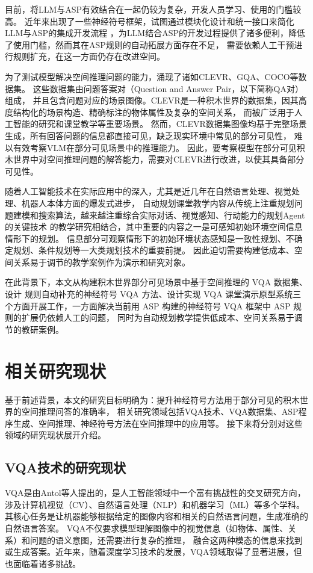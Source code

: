 目前，将LLM与ASP有效结合在一起仍较为复杂，开发人员学习、使用的门槛较高。
近年来出现了一些神经符号框架，试图通过模块化设计和统一接口来简化LLM与ASP的集成开发流程\cite{wang2024dspy}
，为LLM结合ASP的开发过程提供了诸多便利，降低了使用门槛，然而其在ASP规则的自动拓展方面存在不足，
需要依赖人工干预进行规则扩充，在这一方面仍存在改进空间。

为了测试模型解决空间推理问题的能力，涌现了诸如CLEVR、GQA、COCO等数据集。
这些数据集由问题答案对（Question and Answer Pair，以下简称QA对）组成，
并且包含问题对应的场景图像。CLEVR是一种积木世界的数据集，因其高度结构化的场景构造、精确标注的物体属性及复杂的空间关系，
而被广泛用于人工智能的研究和课堂教学等重要场景。
然而，CLEVR数据集图像均基于完整场景生成，所有回答问题的信息都直接可见，缺乏现实环境中常见的部分可见性，
难以有效考察VLM在部分可见场景中的推理能力\cite{sam-abraham-etal-2024-clevr}。
因此，要考察模型在部分可见积木世界中对空间推理问题的解答能力，需要对CLEVR进行改进，以使其具备部分可见性。

随着人工智能技术在实际应用中的深入，尤其是近几年在自然语言处理、视觉处理、机器人本体方面的爆发式进步，
自动规划课堂教学内容从传统上注重规划问题建模和搜索算法，越来越注重综合实际对话、视觉感知、行动能力的规划Agent的关键技术\cite{10.5555/3073924}\cite{gao2025multimodalagenttuningbuilding}
的教学研究相结合，其中重要的内容之一是可感知初始环境空间信息情形下的规划。
信息部分可观察情形下的初始环境状态感知是一致性规划、不确定规划、条件规划等一大类规划技术的重要前提。
因此迫切需要构建低成本、空间关系易于调节的教学案例作为演示和研究对象。

在此背景下，本文从构建积木世界部分可见场景中基于空间推理的 VQA 数据集、设计
规则自动补充的神经符号 VQA 方法、设计实现 VQA 课堂演示原型系统三个方面开展工作，一方面解决当前用 ASP 构建的神经符号 VQA 框架中 ASP 规则的扩展仍依赖人工的问题，
同时为自动规划教学提供低成本、空间关系易于调节的教研案例。
\section{相关研究现状}
基于前述背景，本文的研究目标明确为：提升神经符号方法用于部分可见的积木世界的空间推理问答的准确率，
相关研究领域包括VQA技术、VQA数据集、ASP程序生成、空间推理、神经符号方法在空间推理中的应用等。
接下来将分别对这些领域的研究现状展开介绍。
\subsection{VQA技术的研究现状}
VQA是由Antol等人\cite{Antol2015VQA}提出的，是人工智能领域中一个富有挑战性的交叉研究方向，
涉及计算机视觉（CV）、自然语言处理（NLP）和机器学习（ML）等多个学科。
其核心任务是让机器能够根据给定的图像内容和相关的自然语言问题，生成准确的自然语言答案。
VQA不仅要求模型理解图像中的视觉信息（如物体、属性、关系）和问题的语义意图，还需要进行复杂的推理，
融合这两种模态的信息来找到或生成答案。近年来，随着深度学习技术的发展，VQA领域取得了显著进展，但也面临着诸多挑战。

